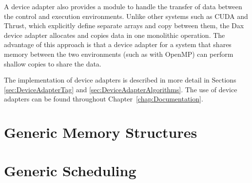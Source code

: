 A device adapter also provides a module to handle the transfer of data
between the control and execution environments. Unlike other systems such
as CUDA and Thrust, which explicitly define separate arrays and copy
between them, the Dax device adapter allocates and copies data in one
monolithic operation. The advantage of this approach is that a device
adapter for a system that shares memory between the two environments (such
as with OpenMP) can perform shallow copies to share the data.

The implementation of device adapters is described in more detail in
Sections \ref{sec:DeviceAdapterTag} and
\ref{sec:DeviceAdapterAlgorithms}. The use of device adapters can be found
throughout Chapter~\ref{chap:Documentation}.



\section{Generic Memory Structures}
\label{sec:GenericMemoryStructures}



\section{Generic Scheduling}
\label{sec:GenericScheduling}


